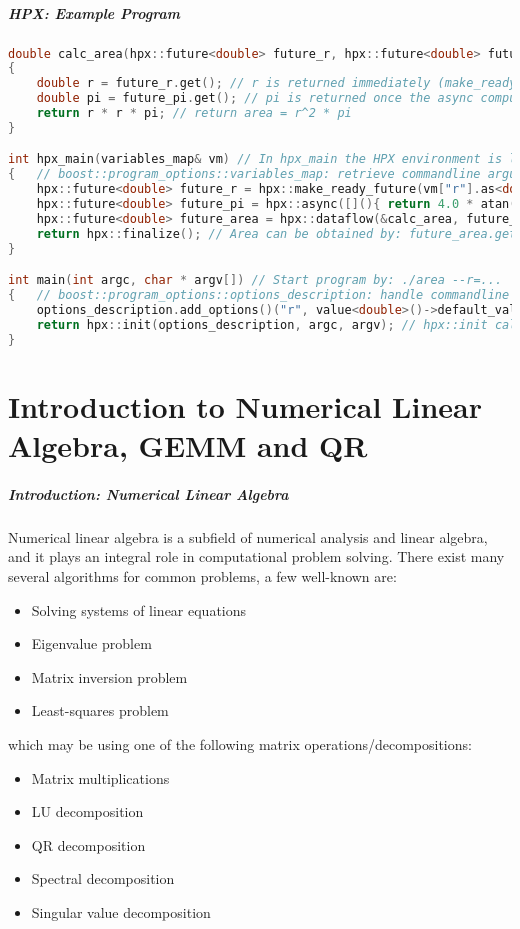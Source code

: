 \begin{frame}[fragile]
\frametitle{HPX: Example Program}
\begin{lstlisting}[language=C++]
double calc_area(hpx::future<double> future_r, hpx::future<double> future_pi)
{
    double r = future_r.get(); // r is returned immediately (make_ready_future)
    double pi = future_pi.get(); // pi is returned once the async computation finishes
    return r * r * pi; // return area = r^2 * pi
}

int hpx_main(variables_map& vm) // In hpx_main the HPX environment is loaded
{   // boost::program_options::variables_map: retrieve commandline arguments
    hpx::future<double> future_r = hpx::make_ready_future(vm["r"].as<double>());
    hpx::future<double> future_pi = hpx::async([](){ return 4.0 * atan(1.0); });
    hpx::future<double> future_area = hpx::dataflow(&calc_area, future_r, future_pi);
    return hpx::finalize(); // Area can be obtained by: future_area.get()
}

int main(int argc, char * argv[]) // Start program by: ./area --r=...
{   // boost::program_options::options_description: handle commandline arguments
    options_description.add_options()("r", value<double>()->default_value(1.0), "Radius: r");
    return hpx::init(options_description, argc, argv); // hpx::init calls hpx_main
}
\end{lstlisting}
\end{frame}

\part{Introduction to Numerical Linear Algebra, GEMM and QR}
\makepart

\begin{frame}
\frametitle{Introduction: Numerical Linear Algebra}
Numerical linear algebra is a subfield of numerical analysis and linear algebra,
and it plays an integral role in computational problem solving.
There exist many several algorithms for common problems, a few well-known are:
\begin{itemize}
 \item Solving systems of linear equations
 \item Eigenvalue problem
 \item Matrix inversion problem
 \item Least-squares problem
\end{itemize}
which may be using one of the following matrix operations/decompositions:
\begin{itemize}
 \item Matrix multiplications
 \item LU decomposition
 \item QR decomposition
 \item Spectral decomposition
 \item Singular value decomposition
\end{itemize}
\end{frame}

